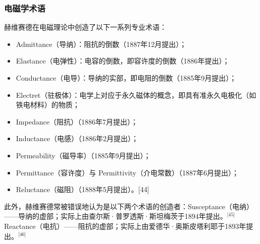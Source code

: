 \subsubsection{电磁学术语}
赫维赛德在电磁理论中创造了以下一系列专业术语：
\begin{itemize}
\item Admittance（导纳）：阻抗的倒数（1887年12月提出）；
\item Elastance（电弹性）：电容的倒数，即容许度的倒数（1886年提出）；
\item Conductance（电导）：导纳的实部，即电阻的倒数（1885年9月提出）；
\item Electret（驻极体）：电学上对应于永久磁体的概念，即具有准永久电极化（如铁电材料）的物质；
\item Impedance（阻抗）（1886年7月提出）；
\item Inductance（电感）（1886年2月提出）；
\item Permeability（磁导率）（1885年9月提出）；
\item Permittance（容许度）与 Permittivity（介电常数）（1887年6月提出）；
\item Reluctance（磁阻）（1888年5月提出）。[44]
\end{itemize}
此外，赫维赛德常被错误地认为是以下两个术语的创造者：Susceptance（电纳）——导纳的虚部；实际上由查尔斯·普罗透斯·斯坦梅茨于1894年提出。\(^\text{[45]}\)Reactance（电抗）——阻抗的虚部；实际上由爱德华·奥斯皮塔利耶于1893年提出。\(^\text{[46]}\)

